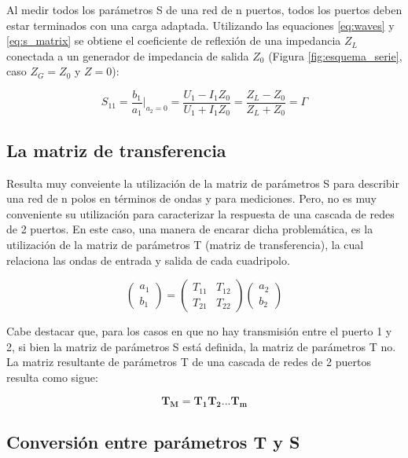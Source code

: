 Al medir todos los parámetros S de una red de n puertos, todos los puertos deben estar terminados con una carga adaptada.
Utilizando las equaciones \ref{eq:waves} y \ref{eq:s_matrix} se obtiene el coeficiente de reflexión de una impedancia $Z_L$
conectada a un generador de impedancia de salida $Z_0$ (Figura \ref{fig:esquema_serie}, caso $Z_G = Z_0$ y $Z = 0$):

\begin{equation}
S_{11} = \dfrac{b_1}{a_1}\bigg|_{a_2=0} = \dfrac{U_1 - I_1Z_0}{U_1 + I_1Z_0} = \dfrac{Z_L - Z_0}{Z_L + Z_0} = \Gamma 
\end{equation}

\subsection{La matriz de transferencia}

Resulta muy conveiente la utilización de la matriz de parámetros S para describir una red de n polos en términos de ondas y 
para mediciones. Pero, no es muy conveniente su utilización para caracterizar la respuesta de una cascada de redes de 2 
puertos. En este caso, una manera de encarar dicha problemática, es la utilización de la matriz de parámetros T (matriz 
de transferencia), la cual relaciona las ondas de entrada y salida de cada cuadripolo.

\begin{equation}
\begin{pmatrix} a_1\\b_1 \end{pmatrix} = \begin{pmatrix} T_{11} & T_{12}\\T_{21} & T_{22} \end{pmatrix} 
\begin{pmatrix} a_2\\b_2 \end{pmatrix}
\end{equation}

Cabe destacar que, para los casos en que no hay transmisión entre el puerto 1 y 2, si bien la matriz de parámetros S está definida, 
la matriz de parámetros T no. La matriz resultante de parámetros T de una cascada de redes de 2 puertos resulta como sigue:

\begin{equation}
\mathbf{T_M=T_1T_2...T_m}
\end{equation}

\subsection{Conversión entre parámetros T y S}

